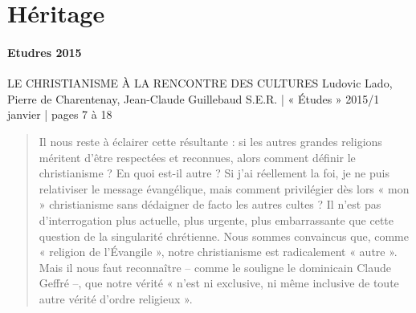 \section{Héritage}

\paragraph{Etudres 2015}
LE CHRISTIANISME À LA RENCONTRE DES CULTURES
Ludovic Lado, Pierre de Charentenay, Jean-Claude Guillebaud
S.E.R. | « Études »
2015/1 janvier | pages 7 à 18
\begin{quote}
    Il nous reste à éclairer cette résultante : si les autres grandes religions
méritent d’être respectées et reconnues, alors comment définir
le christianisme ? En quoi est-il autre ? Si j’ai réellement la foi, je ne
puis relativiser le message évangélique, mais comment privilégier dès
lors « mon » christianisme sans dédaigner de facto les autres cultes ?
Il n’est pas d’interrogation plus actuelle, plus urgente, plus embarrassante
que cette question de la singularité chrétienne. Nous sommes
    convaincus que, comme « religion de l’Évangile », notre christianisme
est radicalement « autre ». Mais il nous faut reconnaître – comme le
souligne le dominicain Claude Geffré –, que notre vérité « n’est ni
exclusive, ni même inclusive de toute autre vérité d’ordre religieux ».
\end{quote}